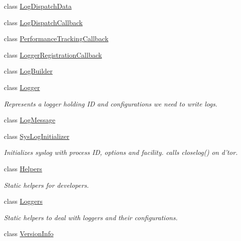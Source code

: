 \begin{DoxyCompactItemize}
class \hyperlink{classel_1_1LogDispatchData}{Log\-Dispatch\-Data}
\item 
class \hyperlink{classel_1_1LogDispatchCallback}{Log\-Dispatch\-Callback}
\item 
class \hyperlink{classel_1_1PerformanceTrackingCallback}{Performance\-Tracking\-Callback}
\item 
class \hyperlink{classel_1_1LoggerRegistrationCallback}{Logger\-Registration\-Callback}
\item 
class \hyperlink{classel_1_1LogBuilder}{Log\-Builder}
\item 
class \hyperlink{classel_1_1Logger}{Logger}
\begin{DoxyCompactList}\small\item\em Represents a logger holding I\-D and configurations we need to write logs. \end{DoxyCompactList}\item 
class \hyperlink{classel_1_1LogMessage}{Log\-Message}
\item 
class \hyperlink{classel_1_1SysLogInitializer}{Sys\-Log\-Initializer}
\begin{DoxyCompactList}\small\item\em Initializes syslog with process I\-D, options and facility. calls closelog() on d'tor. \end{DoxyCompactList}\item 
class \hyperlink{classel_1_1Helpers}{Helpers}
\begin{DoxyCompactList}\small\item\em Static helpers for developers. \end{DoxyCompactList}\item 
class \hyperlink{classel_1_1Loggers}{Loggers}
\begin{DoxyCompactList}\small\item\em Static helpers to deal with loggers and their configurations. \end{DoxyCompactList}\item 
class \hyperlink{classel_1_1VersionInfo}{Version\-Info}
\end{DoxyCompactItemize}
